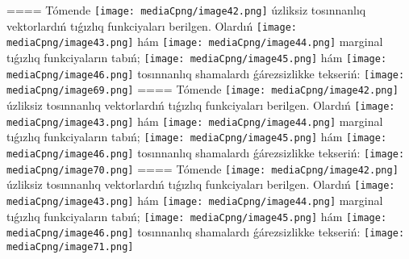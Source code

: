 ====
Tómende \texttt{[image: mediaCpng/image42.png]} úzliksiz tosınnanlıq vektorlardıń tıǵızlıq funkciyaları berilgen. Olardıń \texttt{[image: mediaCpng/image43.png]} hám \texttt{[image: mediaCpng/image44.png]} marginal tıǵızlıq funkciyaların tabıń; \texttt{[image: mediaCpng/image45.png]} hám \texttt{[image: mediaCpng/image46.png]} tosınnanlıq shamalardı ǵárezsizlikke tekseriń: \texttt{[image: mediaCpng/image69.png]}
====
Tómende \texttt{[image: mediaCpng/image42.png]} úzliksiz tosınnanlıq vektorlardıń tıǵızlıq funkciyaları berilgen. Olardıń \texttt{[image: mediaCpng/image43.png]} hám \texttt{[image: mediaCpng/image44.png]} marginal tıǵızlıq funkciyaların tabıń; \texttt{[image: mediaCpng/image45.png]} hám \texttt{[image: mediaCpng/image46.png]} tosınnanlıq shamalardı ǵárezsizlikke tekseriń: \texttt{[image: mediaCpng/image70.png]}
====
Tómende \texttt{[image: mediaCpng/image42.png]} úzliksiz tosınnanlıq vektorlardıń tıǵızlıq funkciyaları berilgen. Olardıń \texttt{[image: mediaCpng/image43.png]} hám \texttt{[image: mediaCpng/image44.png]} marginal tıǵızlıq funkciyaların tabıń; \texttt{[image: mediaCpng/image45.png]} hám \texttt{[image: mediaCpng/image46.png]} tosınnanlıq shamalardı ǵárezsizlikke tekseriń: \texttt{[image: mediaCpng/image71.png]}